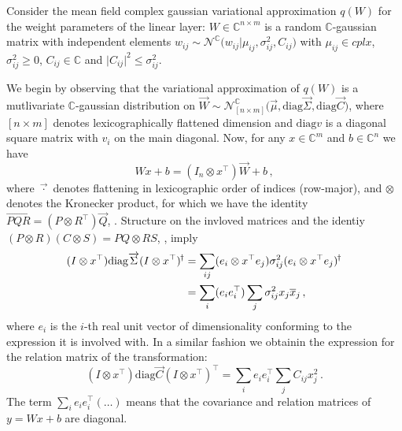 \documentclass[a4paper,10pt]{article}
\newcommand{\cplx}{\mathbb{C}}
\newcommand{\hop}{{\mkern-1.5mu\dagger}}
\newcommand{\conj}[1]{\overline{#1}}
\renewcommand{\vec}[1]{\overrightarrow{#1}}
\newcommand{\diag}[1]{\mathrm{diag}{#1}}
\begin{document}
Consider the mean field complex gaussian variational approximation $q(W)$ for the weight
parameters of the linear layer: $W \in \cplx^{n\times m}$ is a random $\cplx$-gaussian
matrix with independent elements $
  w_{ij} \sim \mathcal{N}^{\cplx}\bigl(
    w_{ij}
    \big \vert
    \mu_{ij}, \sigma^2_{ij}, C_{ij}
  \bigr)
$ with $\mu_{ij}\in cplx$, $\sigma^2_{ij} \geq 0$, $C_{ij}\in \cplx$ and $
  \lvert C_{ij} \rvert^2 \leq \sigma^2_{ij}
$.

We begin by observing that the variational approximation of $q(W)$ is a mutlivariate
$\cplx$-gaussian distribution on $
  \vec{W}
    \sim \mathcal{N}^{\cplx}_{[n\times m]} \bigl(
      \vec{\mu}, \diag{\vec{\Sigma}}, \diag{\vec{C}}
    \bigr)
$, where $[n\times m]$ denotes lexicographically flattened dimension and $\diag{v}$
is a diagonal square matrix with $v_i$ on the main diagonal. Now, for any $x \in \cplx^m$
and $b\in \cplx^n$ we have
$$
W x + b
  = (I_n \otimes x^\top) \vec{W} + b
  \,, $$
where $\vec{\cdot}$ denotes flattening in lexicographic order of indices (row-major),
and $\otimes$ denotes the Kronecker product, for which we have the identity $
  \vec{P Q R} = (P \otimes R^\top) \vec{Q}
$, \cite{petersen_matrix_2012}.
%
Structure on the invloved matrices and the identiy $
  (P \otimes R) (C \otimes S) = P Q \otimes R S
$, \cite{petersen_matrix_2012}, imply
\begin{align}
(I \otimes x^\top) \diag{\vec{\Sigma}} (I \otimes x^\top)^\hop
  &
  = \sum_{ij} (e_i \otimes x^\top e_j)
    \sigma^2_{ij} (e_i \otimes x^\top e_j)^\hop
  \notag \\
  &
  = \sum_i (e_i e_i^\top) \sum_j \sigma^2_{ij} x_j \conj{x}_j
  \,,
\end{align}
where $e_i$ is the $i$-th real unit vector of dimensionality conforming to the
expression it is involved with. In a similar fashion we obtainin the expression
for the relation matrix of the transformation:
\begin{equation}
(I \otimes x^\top) \diag{\vec{C}} (I \otimes x^\top)^\top
  = \sum_i e_i e_i^\top \sum_j C_{ij} x_j^2
  \,.
\end{equation}
The term $
  \sum_i e_i e_i^\top (\ldots)
$ means that the covariance and relation matrices of $y = Wx + b$ are diagonal.
\end{document}

